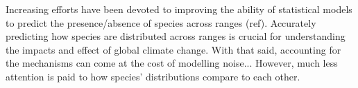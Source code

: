 \documentclass[11pt, a4paper]{article}
\begin{document}


Increasing efforts have been devoted to improving the ability of statistical models to predict the presence/absence of species across ranges (ref). Accurately predicting how species are distributed across ranges is crucial for understanding the impacts and effect of global climate change. With that said, accounting for the mechanisms can come at the cost of modelling noise... However, much less attention is paid to how species' distributions compare to each other. 


\end{document}
